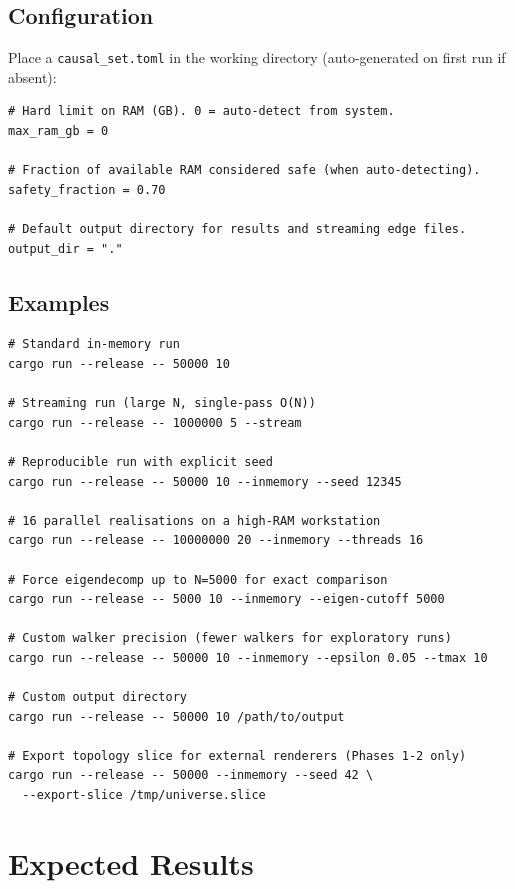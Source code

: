 \documentclass[11pt, a4paper, openany]{book}
\newcommand{\code}[1]{\texttt{#1}}
\begin{document}
\section{Configuration}

Place a \code{causal\_set.toml} in the working directory (auto-generated on
first run if absent):

\begin{verbatim}
# Hard limit on RAM (GB). 0 = auto-detect from system.
max_ram_gb = 0

# Fraction of available RAM considered safe (when auto-detecting).
safety_fraction = 0.70

# Default output directory for results and streaming edge files.
output_dir = "."
\end{verbatim}

\section{Examples}

\begin{verbatim}
# Standard in-memory run
cargo run --release -- 50000 10

# Streaming run (large N, single-pass O(N))
cargo run --release -- 1000000 5 --stream

# Reproducible run with explicit seed
cargo run --release -- 50000 10 --inmemory --seed 12345

# 16 parallel realisations on a high-RAM workstation
cargo run --release -- 10000000 20 --inmemory --threads 16

# Force eigendecomp up to N=5000 for exact comparison
cargo run --release -- 5000 10 --inmemory --eigen-cutoff 5000

# Custom walker precision (fewer walkers for exploratory runs)
cargo run --release -- 50000 10 --inmemory --epsilon 0.05 --tmax 10

# Custom output directory
cargo run --release -- 50000 10 /path/to/output

# Export topology slice for external renderers (Phases 1-2 only)
cargo run --release -- 50000 --inmemory --seed 42 \
  --export-slice /tmp/universe.slice
\end{verbatim}


\chapter{Expected Results}
\end{document}
